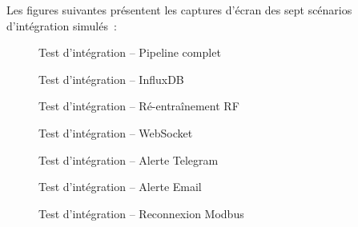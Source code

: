 Les figures suivantes présentent les captures d'écran des sept scénarios d'intégration simulés~:

\begin{figure}[htbp]
  \centering
  \caption{Test d'intégration -- Pipeline complet}
  \label{fig:test_pipeline}
\end{figure}

\begin{figure}[htbp]
  \centering
  \caption{Test d'intégration -- InfluxDB}
  \label{fig:test_influxdb}
\end{figure}

\begin{figure}[htbp]
  \centering
  \caption{Test d'intégration -- Ré-entraînement RF}
  \label{fig:test_rf_retrain}
\end{figure}

\begin{figure}[htbp]
  \centering
  \caption{Test d'intégration -- WebSocket}
  \label{fig:test_websocket}
\end{figure}

\begin{figure}[htbp]
  \centering
  \caption{Test d'intégration -- Alerte Telegram}
  \label{fig:test_telegram}
\end{figure}

\begin{figure}[htbp]
  \centering
  \caption{Test d'intégration -- Alerte Email}
  \label{fig:test_email}
\end{figure}

\begin{figure}[htbp]
  \centering
  \caption{Test d'intégration -- Reconnexion Modbus}
  \label{fig:test_modbus_reconnect}
\end{figure}

